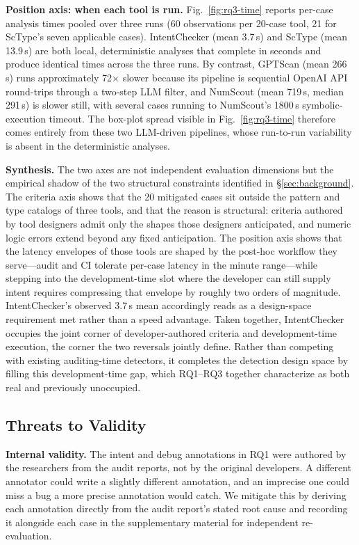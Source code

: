 \documentclass[pdflatex,sn-basic]{sn-jnl}%
\theoremstyle{thmstyleone}%
\theoremstyle{thmstyletwo}%
\theoremstyle{thmstylethree}%
\begin{document}
\smallskip
\noindent\textbf{Position axis: when each tool is run.}
Fig.~\ref{fig:rq3-time} reports per-case analysis times pooled over three runs (60 observations per 20-case tool, 21 for ScType's seven applicable cases).
IntentChecker (mean 3.7\,s) and ScType (mean 13.9\,s) are both local, deterministic analyses that complete in seconds and produce identical times across the three runs.
By contrast, GPTScan (mean 266\,s) runs approximately 72$\times$ slower because its pipeline is sequential OpenAI API round-trips through a two-step LLM filter, and NumScout (mean 719\,s, median 291\,s) is slower still, with several cases running to NumScout's 1800\,s symbolic-execution timeout.
The box-plot spread visible in Fig.~\ref{fig:rq3-time} therefore comes entirely from these two LLM-driven pipelines, whose run-to-run variability is absent in the deterministic analyses.

\smallskip
\noindent\textbf{Synthesis.}
The two axes are not independent evaluation dimensions but the empirical shadow of the two structural constraints identified in \S\ref{sec:background}.
The criteria axis shows that the 20 mitigated cases sit outside the pattern and type catalogs of three tools, and that the reason is structural: criteria authored by tool designers admit only the shapes those designers anticipated, and numeric logic errors extend beyond any fixed anticipation.
The position axis shows that the latency envelopes of those tools are shaped by the post-hoc workflow they serve---audit and CI tolerate per-case latency in the minute range---while stepping into the development-time slot where the developer can still supply intent requires compressing that envelope by roughly two orders of magnitude. IntentChecker's observed 3.7\,s mean accordingly reads as a design-space requirement met rather than a speed advantage.
Taken together, IntentChecker occupies the joint corner of developer-authored criteria and development-time execution, the corner the two reversals jointly define.
Rather than competing with existing auditing-time detectors, it completes the detection design space by filling this development-time gap, which RQ1--RQ3 together characterize as both real and previously unoccupied.

\subsection{Threats to Validity}\label{sec:threats}

\noindent\textbf{Internal validity.}
The intent and debug annotations in RQ1 were authored by the researchers from the audit reports, not by the original developers. A different annotator could write a slightly different annotation, and an imprecise one could miss a bug a more precise annotation would catch.
We mitigate this by deriving each annotation directly from the audit report's stated root cause and recording it alongside each case in the supplementary material for independent re-evaluation.
\end{document}

